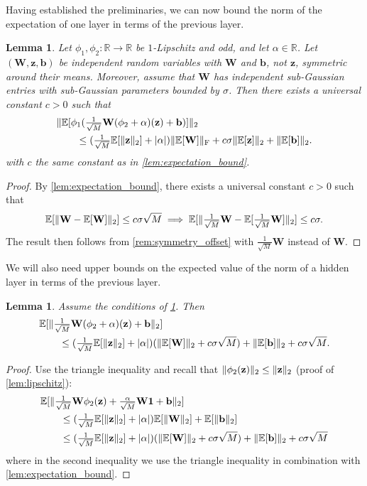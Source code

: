 \documentclass[twoside]{article}
\renewcommand{\ss}[1]{_{\text{#1}}}
\newcommand{\vb}{\mathbf{b}}
\newcommand{\vz}{\mathbf{z}}
\newcommand{\vone}{\mathbf{1}}
\newcommand{\mW}{\mathbf{W}}
\newcommand{\E}{\mathbb{E}}
\newcommand{\R}{\mathbb{R}}
\renewcommand{\ss}[1]{_{\text{#1}}}        %
\DeclarePairedDelimiter\parens{(}{)}             %
\DeclarePairedDelimiter\norm{\|}{\|}             %
\DeclarePairedDelimiter\abs{|}{|}                %
\theoremstyle{theoremstyle}
\newtheorem{lemma}[theorem]{Lemma}
\begin{document}
Having established the preliminaries, we can now bound the norm of the expectation of one layer in terms of the previous layer.
\begin{lemma} \label{lem:bound}
    Let $\phi_1, \phi_2 \colon \R \to \R$ be $1$-Lipschitz and odd, and let $\alpha \in \R$.
    Let $(\mW, \vz, \vb)$ be independent random variables with $\mW$ and $\vb$, not $\vz$, symmetric around their means.
    Moreover, assume that $\mW$ has independent sub-Gaussian entries with sub-Gaussian parameters bounded by $\sigma$.
    Then there exists a universal constant $c > 0$ such that
    \begin{align}
        &\norm{\E[\phi_1(\tfrac1{\sqrt{M}}\mW (\phi_2 + \alpha)(\vz) + \vb)]}_2 \nonumber \\
        &\qquad\le \parens{\tfrac1{\sqrt{M}}\E[\norm{\vz}_2] + \abs{\alpha}}\norm{\E[\mW]}\ss{F} + c \sigma \norm{\E[\vz]}_2 + \norm{\E[\vb]}_2.
    \end{align}
    with $c$ the same constant as in \cref{lem:expectation_bound}.
\end{lemma}
\begin{proof}
    By \cref{lem:expectation_bound}, there exists a universal constant $c > 0$ such that
    \begin{equation}
        \E[\norm{\mW - \E[\mW]}_2] \le c \sigma \sqrt{M}
        \implies
        \E[\norm{\tfrac{1}{\sqrt{M}}\mW - \E[\tfrac{1}{\sqrt{M}}\mW]}_2] 
        \le c \sigma.
    \end{equation}
    The result then follows from \cref{rem:symmetry_offset} with $\tfrac{1}{\sqrt{M}}\mW$ instead of $\mW$.
\end{proof}

We will also need upper bounds on the expected value of the norm of a hidden layer in terms of the previous layer. 
\begin{lemma} \label{lem:bound_norm}
    Assume the conditions of \cref{lem:bound}.
    Then 
    \begin{align}
        &\E[\norm{\tfrac1{\sqrt{M}}\mW (\phi_2 + \alpha)(\vz) + \vb}_2] \nonumber \\
        &\qquad\le (\tfrac1{\sqrt{M}}\E[\norm{\vz}_2] + \abs{\alpha}) (\norm{\E[\mW]}_2 + c\sigma \sqrt{M})  + \norm{\E[\vb]}_2+ c \sigma \sqrt{M}.
    \end{align}
\end{lemma}
\begin{proof}
    Use the triangle inequality and recall that $\norm{\phi_2(\vz)}_2 \le \norm{\vz}_2$ (proof of \cref{lem:lipschitz}):
    \begin{align}
        &\E[\norm{\tfrac1{\sqrt{M}}\mW \phi_2(\vz) + \tfrac{\alpha}{\sqrt{M}}\mW \vone + \vb}_2] \nonumber \\
        &\qquad\le
            (\tfrac1{\sqrt{M}}\E[\norm{\vz}_2] + \abs{\alpha}) \E[\norm{\mW}_2]  + \E[\norm{\vb}_2]\\
        &\qquad\le
            (\tfrac1{\sqrt{M}}\E[\norm{\vz}_2] + \abs{\alpha}) (\norm{\E[\mW]}_2 + c\sigma \sqrt{M})  + \norm{\E[\vb]}_2 + c \sigma \sqrt{M}
    \end{align}
    where in the second inequality we use the triangle inequality in combination with \cref{lem:expectation_bound}.
\end{proof}
\end{document}

